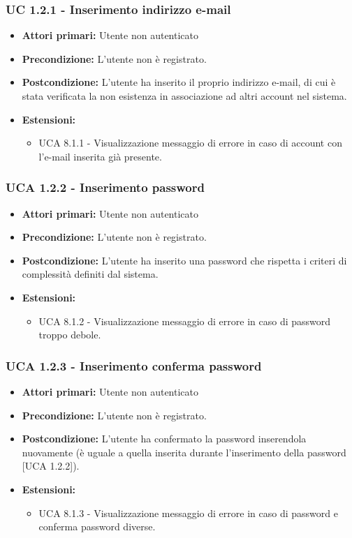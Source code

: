 \subsubsection{UC 1.2.1 - Inserimento indirizzo e-mail}%

\begin{itemize}
\item \textbf{Attori primari:} Utente non autenticato
\item \textbf{Precondizione:} L'utente non è registrato.
\item \textbf{Postcondizione:} L'utente ha inserito il proprio indirizzo e-mail, di cui è stata verificata la non esistenza in associazione ad altri account nel sistema.
\item \textbf{Estensioni:}
	\begin{itemize}
		\item UCA 8.1.1 - Visualizzazione messaggio di errore in caso di account con l'e-mail inserita già presente.
	\end{itemize}
\end{itemize}

\subsubsection{UCA 1.2.2 - Inserimento password}%
\begin{itemize}
\item \textbf{Attori primari:} Utente non autenticato
\item \textbf{Precondizione:} L'utente non è registrato.
\item \textbf{Postcondizione:} L'utente ha inserito una password che rispetta i criteri di complessità definiti dal sistema.
\item \textbf{Estensioni:}
	\begin{itemize}
		\item UCA 8.1.2 - Visualizzazione messaggio di errore in caso di password troppo debole.
	\end{itemize}
\end{itemize}

\subsubsection{UCA 1.2.3 - Inserimento conferma password}%
\begin{itemize}
\item \textbf{Attori primari:} Utente non autenticato
\item \textbf{Precondizione:} L'utente non è registrato.
\item \textbf{Postcondizione:} L'utente ha confermato la password inserendola nuovamente (è uguale a quella inserita durante l'inserimento della password [UCA 1.2.2]).
\item \textbf{Estensioni:}
	\begin{itemize}
		\item UCA 8.1.3 - Visualizzazione messaggio di errore in caso di password e conferma password diverse.
	\end{itemize}
\end{itemize}

